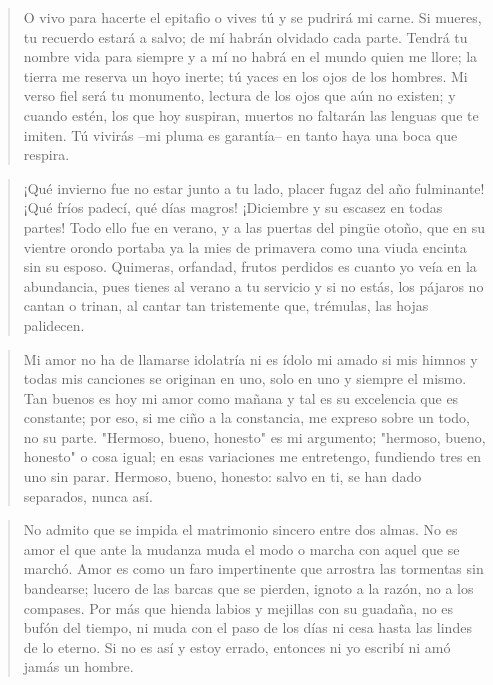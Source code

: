 \documentclass[12pt]{article}
\begin{document}
\clearpage
{}
\begin{verse}
O vivo para hacerte el epitafio  
o vives tú y se pudrirá mi carne.  
Si mueres, tu recuerdo estará a salvo;  
de mí habrán olvidado cada parte.  
Tendrá tu nombre vida para siempre  
y a mí no habrá en el mundo quien me llore;  
la tierra me reserva un hoyo inerte;  
tú yaces en los ojos de los hombres.  
Mi verso fiel será tu monumento,  
lectura de los ojos que aún no existen;  
y cuando estén, los que hoy suspiran, muertos  
no faltarán las lenguas que te imiten.  
Tú vivirás --mi pluma es garantía--  
en tanto haya una boca que respira.

\end{verse}

\clearpage
{}
\begin{verse}
¡Qué invierno fue no estar junto a tu lado,  
placer fugaz del año fulminante!  
¡Qué fríos padecí, qué días magros!  
¡Diciembre y su escasez en todas partes!  
Todo ello fue en verano, y a las puertas  
del pingüe otoño, que en su vientre orondo  
portaba ya la mies de primavera  
como una viuda encinta sin su esposo.  
Quimeras, orfandad, frutos perdidos  
es cuanto yo veía en la abundancia,  
pues tienes al verano a tu servicio  
y si no estás, los pájaros no cantan  
o trinan, al cantar tan tristemente  
que, trémulas, las hojas palidecen.

\end{verse}

\clearpage
{}
\begin{verse}
Mi amor no ha de llamarse idolatría  
ni es ídolo mi amado si mis himnos  
y todas mis canciones se originan  
en uno, solo en uno y siempre el mismo.  
Tan buenos es hoy mi amor como mañana  
y tal es su excelencia que es constante;  
por eso, si me ciño a la constancia,  
me expreso sobre un todo, no su parte.  
"Hermoso, bueno, honesto" es mi argumento;  
"hermoso, bueno, honesto" o cosa igual;  
en esas variaciones me entretengo,  
fundiendo tres en uno sin parar.  
Hermoso, bueno, honesto: salvo en ti,  
se han dado separados, nunca así.

\end{verse}

\clearpage
{}
\begin{verse}
No admito que se impida el matrimonio  
sincero entre dos almas. No es amor  
el que ante la mudanza muda el modo  
o marcha con aquel que se marchó.  
Amor es como un faro impertinente  
que arrostra las tormentas sin bandearse;  
lucero de las barcas que se pierden,  
ignoto a la razón, no a los compases.  
Por más que hienda labios y mejillas  
con su guadaña, no es bufón del tiempo,  
ni muda con el paso de los días  
ni cesa hasta las lindes de lo eterno.  
Si no es así y estoy errado, entonces  
ni yo escribí ni amó jamás un hombre.

\end{verse}
\end{document}
